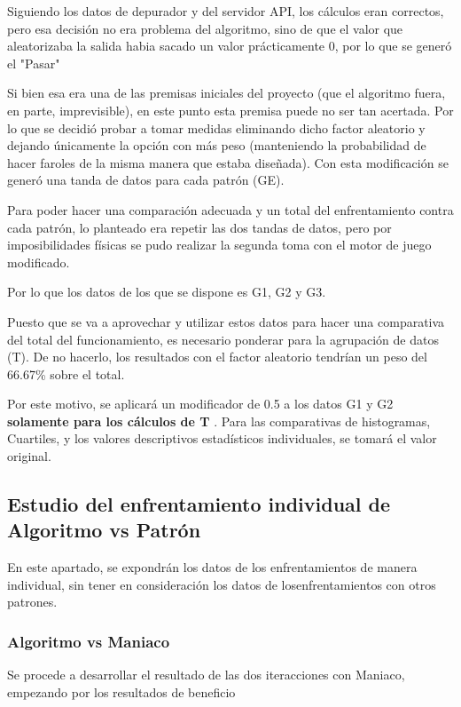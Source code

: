 Siguiendo los datos de depurador y del servidor API, los cálculos eran correctos, pero esa decisión no era problema del algoritmo, sino de que el valor que aleatorizaba la salida habia sacado un valor prácticamente 0, por lo que se generó el "Pasar"

Si bien esa era una de las premisas iniciales del proyecto (que el algoritmo fuera, en parte, imprevisible), en este punto esta premisa puede no ser tan acertada. Por lo que se decidió probar a tomar medidas eliminando dicho factor aleatorio y dejando únicamente la opción con más peso (manteniendo la probabilidad de hacer faroles de la misma manera que estaba diseñada). 
Con esta modificación se generó una tanda de datos para cada patrón (GE).

Para poder hacer una comparación adecuada y un total del enfrentamiento contra cada patrón, lo planteado era repetir las dos tandas de datos, pero por imposibilidades físicas se pudo realizar la segunda toma con el motor de juego modificado. 

Por lo que los datos de los que se dispone es G1, G2 y G3. 

Puesto que se va a aprovechar y utilizar estos datos para hacer una comparativa del total del funcionamiento, es necesario ponderar para la agrupación de datos (T). De no hacerlo, los resultados con el factor aleatorio tendrían un peso del 66.67\% sobre el total.

Por este motivo, se aplicará un modificador de 0.5 a los datos G1 y G2 \textbf{solamente para los cálculos de T} . Para las comparativas de histogramas, Cuartiles, y los valores descriptivos estadísticos individuales, se tomará el valor original.

\subsection{Estudio del enfrentamiento individual de Algoritmo vs Patrón}
\label{sec:AvP}

En este apartado, se expondrán los datos de los enfrentamientos de manera individual, sin tener en consideración los datos de losenfrentamientos con otros patrones. 

\subsubsection{Algoritmo vs Maniaco}

Se procede a desarrollar el resultado de las dos iteracciones con Maniaco, empezando por los resultados de beneficio

